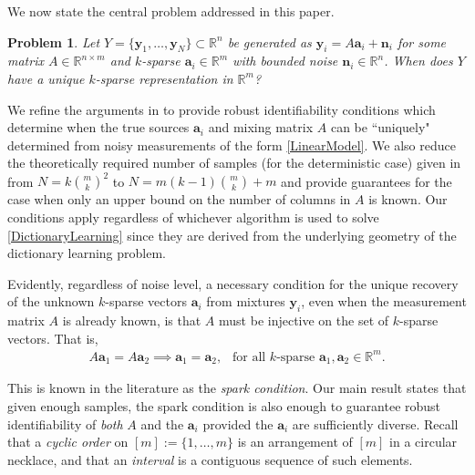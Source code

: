 \documentclass[journal, onecolumn]{IEEEtran}
\newtheorem{problem}{Problem}
\begin{document}
We now state the central problem addressed in this paper.

\begin{problem}\label{DUTproblem}
Let $Y = \{\mathbf{y}_1, \ldots, \mathbf{y}_N \} \subset \mathbb{R}^n$ be generated as $\mathbf{y}_i = A\mathbf{a}_i  + \mathbf{n}_i$ for some matrix $A \in \mathbb{R}^{n \times m}$ and $k$-sparse $\mathbf{a}_i \in \mathbb{R}^m$ with bounded noise $\mathbf{n}_i \in \mathbb{R}^n$. When does $Y$ have a unique $k$-sparse representation in $\mathbb{R}^m$?
\end{problem}

We refine the arguments in \cite{Hillar15} to provide robust identifiability conditions which determine when the true sources $\mathbf{a}_i$ and mixing matrix $A$ can be ``uniquely" determined from noisy measurements of the form \eqref{LinearModel}. We also reduce the theoretically required number of samples (for the deterministic case) given in \cite{Hillar15} from $N=k{m \choose k}^2$ to $N = m(k-1){m \choose k}+m$ and provide guarantees for the case when only an upper bound on the number of columns in $A$ is known. Our conditions apply regardless of whichever algorithm is used to solve \eqref{DictionaryLearning} since they are derived from the underlying geometry of the dictionary learning problem. 

Evidently, regardless of noise level, a necessary condition for the unique recovery of the unknown $k$-sparse vectors $\mathbf{a}_i$ from mixtures $\mathbf{y}_i$, even when the measurement matrix $A$ is already known, is that $A$ must be injective on the set of $k$-sparse vectors. That is,
\begin{align}\label{SparkCondition}
A\mathbf{a}_1 = A\mathbf{a}_2 \implies \mathbf{a}_1 = \mathbf{a}_2, \ \ \text{ for all $k$-sparse } \mathbf{a}_1, \mathbf{a}_2 \in \mathbb{R}^m.
\end{align}

This is known in the literature as the \emph{spark condition}. Our main result states that given enough samples, the spark condition is also enough to guarantee robust identifiability of \emph{both} $A$ and the $\mathbf{a}_i$ provided the $\mathbf{a}_i$ are sufficiently diverse.  Recall that a \textit{cyclic order} on $[m] := \{1, \ldots,m\}$ is an arrangement of $[m]$ in a circular necklace, and that an \textit{interval} is a contiguous sequence of such elements. 
\end{document}
